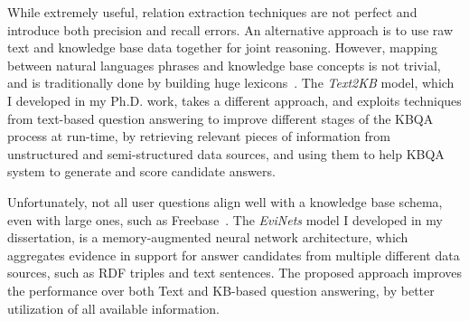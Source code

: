 While extremely useful, relation extraction techniques are not perfect and introduce both precision and recall errors.
An alternative approach is to use raw text and knowledge base data together for joint reasoning.
However, mapping between natural languages phrases and knowledge base concepts is not trivial, and is traditionally done by building huge lexicons~\cite{BerantCFL13:sempre,BerantL14:parasempre}.
The \textit{Text2KB} model, which I developed in my Ph.D. work, takes a different approach, and exploits techniques from text-based question answering to improve different stages of the KBQA process at run-time, \ie by retrieving relevant pieces of information from unstructured and semi-structured data sources, and using them to help KBQA system to generate and score candidate answers.

Unfortunately, not all user questions align well with a knowledge base schema, even with large ones, such as Freebase~\cite{Fader:2014:OQA:2623330.2623677}.
The \textit{EviNets} model I developed in my dissertation, is a memory-augmented neural network architecture, which aggregates evidence in support for answer candidates from multiple different data sources, such as RDF triples and text sentences.
The proposed approach improves the performance over both Text and KB-based question answering, by better utilization of all available information.


